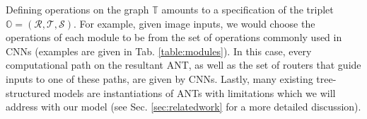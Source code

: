 Defining operations on the graph $\mathbb{T}$ amounts to a specification of the triplet $\mathbb{O} = (\mathcal{R}, \mathcal{T}, \mathcal{S})$. For example, given image inputs, we would choose the operations of each module to be from the set of operations commonly used in CNNs (examples are given in Tab. \ref{table:modules}).
In this case, every computational path on the resultant ANT, as well as the set of routers that guide inputs to one of these paths, are given by CNNs. Lastly, many existing tree-structured models  \cite{suarez1999globally,irsoy2012soft,laptev2014convolutional,rota2014neural,kontschieder2015deep,frosst2017distilling,xiao2017ndt} are instantiations of ANTs with limitations which we will address with our model (see Sec. \ref{sec:relatedwork} for a more detailed discussion).



 


